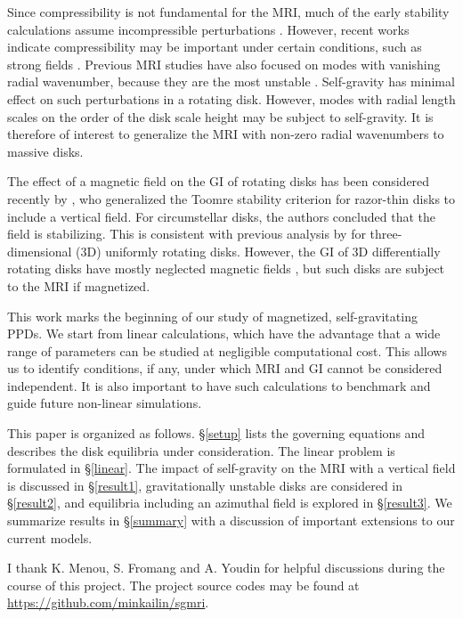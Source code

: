 \documentclass[iop]{emulateapj}
\begin{document}
Since compressibility is not fundamental for the MRI, much of the
early stability calculations assume incompressible perturbations
\citep{goodman94,jin96}. However, recent works indicate
compressibility may be important under certain conditions,
such as strong fields \citep{kim00, pessah05,bonanno07}.   
Previous MRI studies have also focused on modes with vanishing
radial wavenumber, because they are the most unstable
\citep{sano99,reyes01}. Self-gravity has minimal effect on such
perturbations in a rotating disk. However, modes
with radial length scales on the order of the disk scale height may be
subject to self-gravity. It is therefore of interest to generalize the MRI with
non-zero radial wavenumbers to massive disks. 



The effect of a magnetic field on the GI of rotating disks has been
considered recently by \cite{lizano10}, who generalized the Toomre stability
criterion for razor-thin disks to include a vertical field. For
circumstellar disks, the authors concluded that the field is
stabilizing. This is consistent with previous analysis by
\cite{nakamura83} for three-dimensional (3D) uniformly rotating
disks. However, the GI of 3D differentially rotating disks have
mostly neglected magnetic fields \citep{mamat10,kim12}, but such disks
are subject to the MRI if magnetized. 


This work marks the beginning of our study of magnetized,
self-gravitating PPDs. We start from linear calculations, which  
have the advantage that a wide range of parameters can be studied at
negligible computational cost. This  allows us to identify
conditions, if any, under which MRI and GI 
cannot be considered independent. It is also important to have such 
calculations to benchmark and guide future non-linear
simulations.   


This paper is organized as follows. \S\ref{setup} lists the governing
equations and describes the disk equilibria under consideration. 
The linear problem is formulated in \S\ref{linear}. The impact
of self-gravity on the MRI with a vertical field is discussed in
\S\ref{result1}, gravitationally unstable disks are considered in
\S\ref{result2}, and equilibria including an azimuthal field is explored in
\S\ref{result3}. We summarize results in \S\ref{summary} with a 
discussion of important extensions to our current models.





 


\acknowledgements
I thank K. Menou, S. Fromang and A. Youdin for helpful discussions
during the course of this project. The project source codes may be found at
\url{https://github.com/minkailin/sgmri}. 

\appendix




\end{document}
